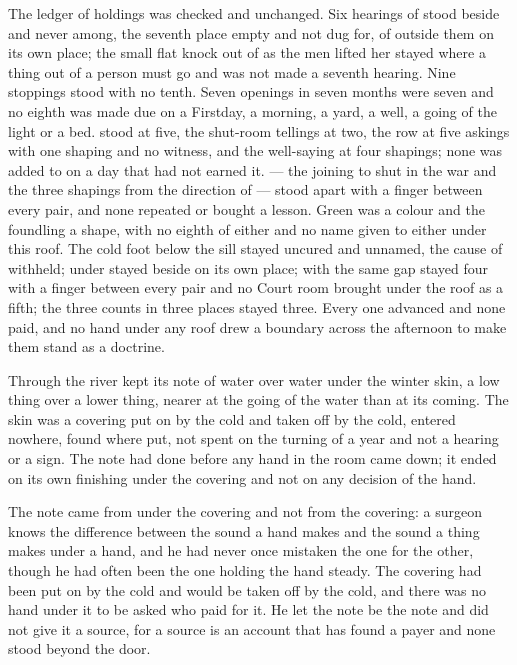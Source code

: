 The ledger of holdings was checked and unchanged. Six hearings of  stood beside and never among, the seventh place empty and not dug for,  of  outside them on its own place; the small flat knock out of  as the men lifted her stayed where a thing out of a person must go and was not made a seventh hearing. Nine stoppings stood with no tenth. Seven openings in seven months were seven and no eighth was made due on a Firstday, a morning, a yard, a well, a going of the light or a bed.  stood at five, the shut-room tellings at two, the row at five askings with one shaping and no witness, and the well-saying at four shapings; none was added to on a day that had not earned it.  --- the joining to  shut in the war and the three shapings from the direction of  --- stood apart with a finger between every pair, and none repeated or bought a lesson. Green was a colour and the foundling a shape, with no eighth of either and no name given to either under this roof. The cold foot below the sill stayed uncured and unnamed, the cause of  withheld;  under  stayed beside  on its own place;  with the same gap stayed four with a finger between every pair and no Court room brought under the roof as a fifth; the three counts in three places stayed three. Every one advanced and none paid, and no hand under any roof drew a boundary across the afternoon to make them stand as a doctrine.

\scenebreak

Through  the river kept its note of water over water under the winter skin, a low thing over a lower thing, nearer at the going of the water than at its coming. The skin was a covering put on by the cold and taken off by the cold, entered nowhere, found where put, not spent on the turning of a year and not a hearing or a sign. The note had done before any hand in the room came down; it ended on its own finishing under the covering and not on any decision of the hand.

The note came from under the covering and not from the covering: a surgeon knows the difference between the sound a hand makes and the sound a thing makes under a hand, and he had never once mistaken the one for the other, though he had often been the one holding the hand steady. The covering had been put on by the cold and would be taken off by the cold, and there was no hand under it to be asked who paid for it. He let the note be the note and did not give it a source, for a source is an account that has found a payer and none stood beyond the door.

